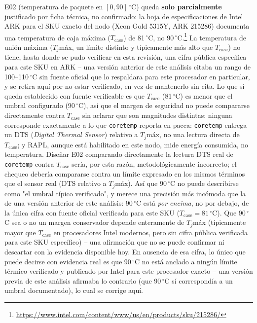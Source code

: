 E02 (temperatura de paquete en $[0,90]\,^{\circ}\text{C}$) queda
\textbf{solo parcialmente} justificado por ficha técnica, no confirmado:
la hoja de especificaciones de Intel ARK para el SKU exacto del nodo (Xeon
Gold 5315Y, ARK 215286) documenta una temperatura de caja máxima
($T_{\text{case}}$) de 81\,$^{\circ}$C, no
90\,$^{\circ}$C.\footnote{\url{https://www.intel.com/content/www/us/en/products/sku/215286/}}
La temperatura de unión máxima ($T_j$máx, un límite distinto y típicamente
más alto que $T_{\text{case}}$) no tiene, hasta donde se pudo verificar en
esta revisión, una cifra pública específica para este SKU en ARK -- una
versión anterior de este análisis citaba un rango de 100--110\,$^{\circ}$C
sin fuente oficial que lo respaldara para este procesador en particular, y
se retira aquí por no estar verificado, en vez de mantenerlo sin cita. Lo
que sí queda establecido con fuente verificable es que $T_{\text{case}}$
(81\,$^{\circ}$C) es menor que el umbral configurado (90\,$^{\circ}$C),
así que el margen de seguridad no puede compararse directamente contra
$T_{\text{case}}$ sin aclarar que son magnitudes distintas: ninguna
corresponde exactamente a lo que \texttt{coretemp} reporta en pacca:
\texttt{coretemp} entrega un DTS (\textit{Digital
Thermal Sensor}) relativo a $T_j$máx, no una lectura directa de
$T_{\text{case}}$; y RAPL, aunque está habilitado en este nodo, mide
energía consumida, no temperatura. Diseñar E02 comparando directamente la
lectura DTS real de \texttt{coretemp} contra
$T_{\text{case}}$ sería, por esta razón, metodológicamente incorrecto; el
chequeo debería compararse contra un límite expresado en
los mismos términos que el sensor real (DTS relativo a $T_j$máx). Así que
90\,$^{\circ}$C no puede describirse como "el umbral típico verificado", y
merece una precisión más incómoda que la de una versión anterior de este
análisis: 90\,$^{\circ}$C está \emph{por encima}, no por debajo, de la
única cifra con fuente oficial verificada para este SKU
($T_{\text{case}}=81\,^{\circ}\text{C}$). Que 90\,$^{\circ}$C sea o no un
margen conservador depende enteramente de $T_j$máx (típicamente mayor que
$T_{\text{case}}$ en procesadores Intel modernos, pero sin cifra pública
verificada para este SKU específico) -- una afirmación que no se puede
confirmar ni descartar con la evidencia disponible hoy. En ausencia de esa
cifra, lo único que puede decirse con evidencia real es que 90\,$^{\circ}$C
no está anclado a ningún límite térmico verificado y publicado por Intel
para este procesador exacto -- una versión previa de este análisis
afirmaba lo contrario (que 90\,$^{\circ}$C sí correspondía a un umbral
documentado), lo cual se corrige aquí.


